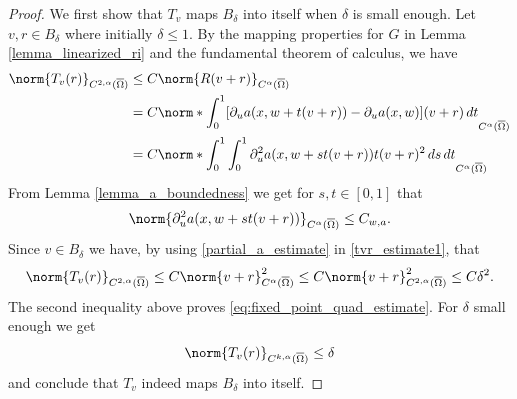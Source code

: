 \documentclass[11pt,a4paper]{amsart}
\theoremstyle{definition}
\numberwithin{equation}{section}
\newcommand{\ol}[1]{\overline{#1}}
\newcommand{\p}{\partial}
\newcommand{\Om}{\Omega}
\begin{document}
\begin{proof}
We first show that $T_v$ maps $B_{\delta}$ into itself when $\delta$ is small enough.
Let $v, r\in B_{\delta}$ where initially $\delta \leq 1$.
By the mapping properties for $G$ in Lemma \ref{lemma_linearized_ri} and the fundamental theorem of calculus, we have 
\begin{align}\label{tvr_estimate1}
	\norm{T_v(r)}_{C^{2,\alpha}(\ol{\Om})}&\leq C \norm{R(v+r)}_{C^{\alpha}(\ol{\Om})} \\\notag
	&= C \norm*{\int_0^1 [\p_u a(x,w+t(v+r)) - \p_u a(x,w)](v+r) \,dt}_{C^{\alpha}(\ol{\Om})}\\\notag
	&= C \norm*{\int_0^1\int_0^1\p_u^2a(x,w+st(v+r))t(v+r)^2\,ds\,dt}_{C^{\alpha}(\ol{\Om})}
\end{align}
From Lemma \ref{lemma_a_boundedness} we get for $s, t \in [0,1]$ that 
\begin{equation}\label{partial_a_estimate}
	\norm{\partial_{u}^{2}a(x,w+st(v+r))}_{C^{\alpha}(\ol{\Omega})} \leq C_{w,a}.
\end{equation}
Since $v\in B_{\delta}$ we have, by using \eqref{partial_a_estimate} in \eqref{tvr_estimate1}, that
\begin{equation*}
	\norm{T_v(r)}_{C^{2,\alpha}(\ol{\Om})}\leq C\norm{v+r}_{C^{\alpha}(\ol{\Om})}^2 \leq  C\norm{v+r}_{C^{2,\alpha}(\ol{\Om})}^2 \leq C\delta^2.
\end{equation*}
The second inequality above proves \eqref{eq:fixed_point_quad_estimate}.
For $\delta$ small enough we get
\begin{equation*}
	\norm{T_v(r)}_{C^{k,\alpha}(\ol{\Om})}\leq \delta
\end{equation*}
and conclude that $T_v$ indeed maps $B_{\delta}$ into itself.


\end{proof}
\end{document}
